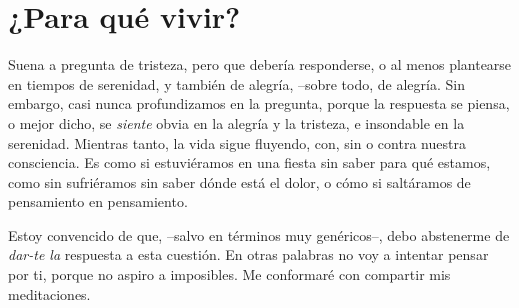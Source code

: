\chapter{¿Para qué vivir?}

Suena a pregunta de tristeza, pero que debería responderse, o al menos plantearse en tiempos de serenidad, y también de alegría, --sobre todo, de alegría. Sin embargo, casi nunca profundizamos en la pregunta, porque la respuesta se piensa, o mejor dicho, se \emph{siente} obvia en la alegría y la tristeza, e insondable en la serenidad. Mientras tanto, la vida sigue fluyendo, con, sin o contra nuestra consciencia. Es como si estuviéramos en una fiesta sin saber para qué estamos, como sin sufriéramos sin saber dónde está el dolor, o cómo si saltáramos de pensamiento en pensamiento.

Estoy convencido de que, --salvo en términos muy genéricos--, debo abstenerme de \emph{dar-te la} respuesta a esta cuestión. En otras palabras no voy a intentar pensar por ti, porque no aspiro a imposibles. Me conformaré con compartir mis meditaciones.